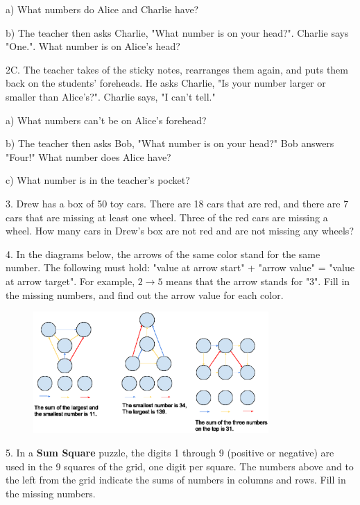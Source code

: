 \documentclass{article}
\begin{document}
a) What numbers do Alice and Charlie have?

b) The teacher then asks Charlie, "What number is on your head?". Charlie says "One.". What number is on Alice's head?
\vspace{3mm}

2C. The teacher takes of the sticky notes, rearranges them again, and puts them back on the students' foreheads. He asks Charlie, "Is your number larger or smaller than Alice's?". Charlie says, "I can't tell."

a) What numbers can't be on Alice's forehead?

b) The teacher then asks Bob, "What number is on your head?" Bob answers "Four!" What number does Alice have?

c) What number is in the teacher's pocket?
\vspace{5mm}

3. Drew has a box of 50 toy cars. There are 18 cars that are red, and there are 7 cars that are missing at least one wheel. Three of the red cars are missing a wheel. How many cars in Drew's box are not red and are not missing any wheels?
\vspace{5mm}

4. In the diagrams below, the arrows of the same color stand for the same number. The following must hold: "value at arrow start" + "arrow value" = "value at arrow target". For example, $2 \rightarrow 5$ means that the arrow stands for "3". Fill in the missing numbers, and find out the arrow value for each color.

\begin{figure}[H]
  \includegraphics[width=0.8\textwidth]{pavuciny45.eps}
\end{figure}

5. In a {\bf Sum Square} puzzle, the digits 1 through 9 (positive or negative) are used in the 9 squares of the grid, one digit per square. The numbers above and to the left from the grid indicate the sums of numbers in columns and rows. Fill in the missing numbers.
\end{document}
